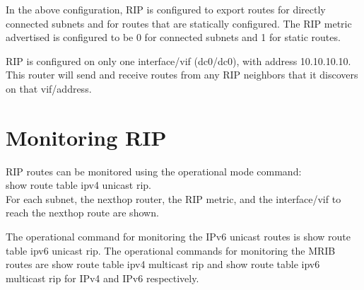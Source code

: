 In the above configuration, RIP is configured to export routes for
directly connected subnets and for routes that are statically
configured.  The RIP metric advertised is configured to be 0 for
connected subnets and 1 for static routes.

RIP is configured on only one interface/vif ({\stt dc0/dc0}), with
address 10.10.10.10.  This router will send and receive routes from
any RIP neighbors that it discovers on that vif/address.

\newpage
\section{Monitoring RIP}

RIP routes can be monitored using the operational mode command: \\
{\stt show route table ipv4 unicast rip}.  \\
For each subnet, the nexthop
router, the RIP metric, and the interface/vif to reach the nexthop
route are shown.

\vspace{0.1in}
\noindent{}

The operational command for monitoring the IPv6 unicast routes
is {\stt show route table ipv6 unicast rip}.
The operational commands for monitoring the MRIB routes
are {\stt show route table ipv4 multicast rip}
and {\stt show route table ipv6 multicast rip}
for IPv4 and IPv6 respectively.
